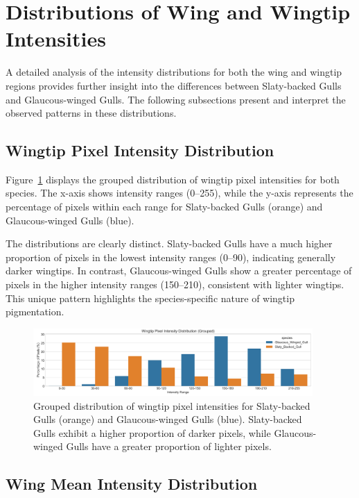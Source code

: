 \documentclass[a4paper,12pt]{report}
\begin{document}
\section{Distributions of Wing and Wingtip Intensities}

A detailed analysis of the intensity distributions for both the wing and wingtip regions provides further insight into the differences between Slaty-backed Gulls and Glaucous-winged Gulls. The following subsections present and interpret the observed patterns in these distributions.

\subsection{Wingtip Pixel Intensity Distribution}

Figure~\ref{fig:wingtip_intensity_distribution} displays the grouped distribution of wingtip pixel intensities for both species. The x-axis shows intensity ranges (0--255), while the y-axis represents the percentage of pixels within each range for Slaty-backed Gulls (orange) and Glaucous-winged Gulls (blue).

The distributions are clearly distinct. Slaty-backed Gulls have a much higher proportion of pixels in the lowest intensity ranges (0--90), indicating generally darker wingtips. In contrast, Glaucous-winged Gulls show a greater percentage of pixels in the higher intensity ranges (150--210), consistent with lighter wingtips. This unique pattern highlights the species-specific nature of wingtip pigmentation.

\begin{figure}[h]
\centering
\includegraphics[width=0.95\textwidth]{images/REPORT_IMAGES_INTENSITY/I2/intensitydistribution.png}
\caption{Grouped distribution of wingtip pixel intensities for Slaty-backed Gulls (orange) and Glaucous-winged Gulls (blue). Slaty-backed Gulls exhibit a higher proportion of darker pixels, while Glaucous-winged Gulls have a greater proportion of lighter pixels.}
\label{fig:wingtip_intensity_distribution}
\end{figure}

\subsection{Wing Mean Intensity Distribution}
\end{document}
